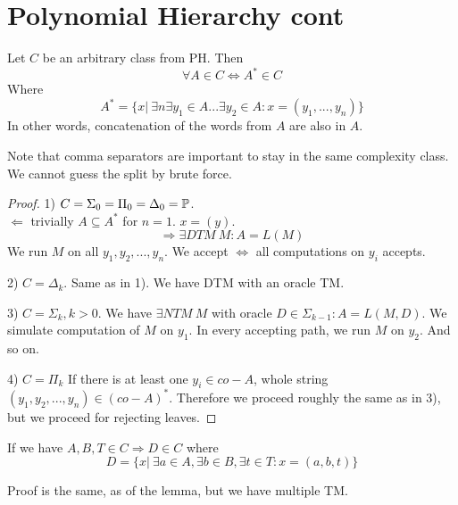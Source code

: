 \section{\texorpdfstring{Polynomial Hierarchy cont}{Polynomial Hierarchy cont}}
\vspace{5mm}
\large

\begin{lemma}
	Let $C$ be an arbitrary class from PH.
	Then
	\[ \forall A \in C \iff A^{\ast} \in C \]
	Where
	\[ A^{\ast} = \{ x |\ \exists n \exists y_1 \in A ... \exists y_2 \in A: x = (y_1, ..., y_n) \} \]
	In other words, concatenation of the words from $A$ are also in $A$.

	Note that comma separators are important to stay in the same complexity class.
	We cannot guess the split by brute force.
\end{lemma}
\begin{proof}
	1) $C = \Sigma_0 = \Pi_0 = \Delta_0 = \operatorname{\mathbb{P}}$.\\
	$\Leftarrow$ trivially $A \subseteq A^{\ast}$ for $n = 1$.
	$x = (y)$.\\
	\[ \Rightarrow \exists DTM\ M: A = L(M) \]
	We run $M$ on all $y_1, y_2, ..., y_n$.
	We accept $\iff$ all computations on $y_i$ accepts.

	2) $C = \Delta_k$.
	Same as in 1). We have DTM with an oracle TM.

	3) $C = \Sigma_k, k > 0$.
	We have
	$ \exists NTM\ M$ with oracle $D \in \Sigma_{k - 1}: A = L(M, D)$.
	We simulate computation of $M$ on $y_1$.
	In every accepting path, we run $M$ on $y_2$. And so on.

	4) $C = \Pi_k$
	If there is at least one $y_i \in co-A$, whole string $(y_1, y_2, ..., y_n) \in (co-A)^{\ast}$.
	Therefore we proceed roughly the same as in 3), but we proceed for rejecting leaves.
\end{proof}

\begin{consequence}
	If we have $A,B,T \in C \Rightarrow D \in C$ where
	\[ D = \{ x |\ \exists a \in A, \exists b \in B, \exists t \in T: x = (a, b, t) \} \]

	Proof is the same, as of the lemma, but we have multiple TM.
\end{consequence}

